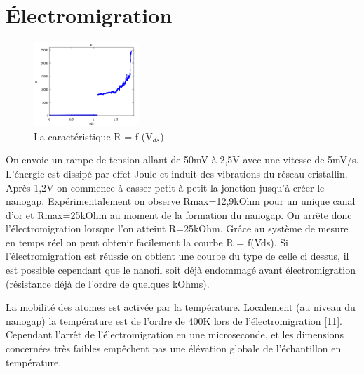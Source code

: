 \section{Électromigration}
\begin{figure}[h]
    \begin{center}
        \includegraphics[width=150px]{Images/Image_Electromigration_1.png}
        \caption{La caractéristique R = f (V$_{ds}$)}
        \label{fig:}
    \end{center}
\end{figure}
On envoie un rampe de tension allant de 50mV à 2,5V avec une vitesse de 5mV/s.
L’énergie est dissipé par effet Joule et induit des vibrations du réseau cristallin. Après 1,2V  on commence à casser petit à petit la jonction jusqu’à créer le nanogap. Expérimentalement on observe Rmax=12,9kOhm pour un unique canal d’or et Rmax=25kOhm au moment de la formation du nanogap. On arrête donc l’électromigration lorsque l’on atteint R=25kOhm.
Grâce au système de mesure en temps réel on peut obtenir facilement la courbe R = f(Vds). Si l’électromigration est réussie on obtient une courbe du type de celle ci dessus, il est possible cependant que le nanofil soit déjà endommagé avant électromigration (résistance déjà de l’ordre de quelques kOhms). 

La mobilité des atomes est activée par la température. Localement (au niveau du nanogap) la température est de l’ordre de 400K lors de l’électromigration [11]. Cependant l’arrêt de l’électromigration en une microseconde, et les dimensions concernées très faibles empêchent pas une élévation globale de l’échantillon en température.
